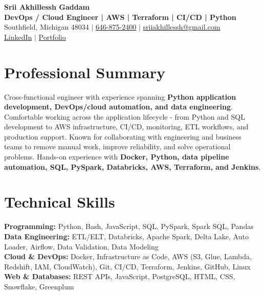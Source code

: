 \documentclass[letterpaper,10pt]{article}
\begin{document}
\fontsize{9.35pt}{10.45pt}\selectfont

\begin{center}
    {\LARGE \textbf{Srii Akhillessh Gaddam}} \\[-1pt]
    \textbf{DevOps / Cloud Engineer | AWS | Terraform | CI/CD | Python} \\[2pt]
    Southfield, Michigan 48034 $|$
    \href{tel:6468752400}{646-875-2400} $|$
    \href{mailto:sriiakhillessh@gmail.com}{sriiakhillessh@gmail.com} \\[1pt]
    \href{https://www.linkedin.com/in/srii-akhiilessh-gaddam-b48668191/}{LinkedIn} $|$
    \href{https://sriiakhillesshg.github.io/portfolio/}{Portfolio}
\end{center}
\vspace{-8pt}

\section{Professional Summary}
\small{Cross-functional engineer with experience spanning \textbf{Python application development, DevOps/cloud automation, and data engineering}. Comfortable working across the application lifecycle - from Python and SQL development to AWS infrastructure, CI/CD, monitoring, ETL workflows, and production support. Known for collaborating with engineering and business teams to remove manual work, improve reliability, and solve operational problems. Hands-on experience with \textbf{Docker, Python, data pipeline automation, SQL, PySpark, Databricks, AWS, Terraform, and Jenkins}.}

\section{Technical Skills}
\small{
\textbf{Programming:} Python, Bash, JavaScript, SQL, PySpark, Spark SQL, Pandas \\
\textbf{Data Engineering:} ETL/ELT, Databricks, Apache Spark, Delta Lake, Auto Loader, Airflow, Data Validation, Data Modeling \\
\textbf{Cloud \& DevOps:} Docker, Infrastructure as Code, AWS (S3, Glue, Lambda, Redshift, IAM, CloudWatch), Git, CI/CD, Terraform, Jenkins, GitHub, Linux \\
\textbf{Web \& Databases:} REST APIs, JavaScript, PostgreSQL, HTML, CSS, Snowflake, Greenplum
}
\end{document}
